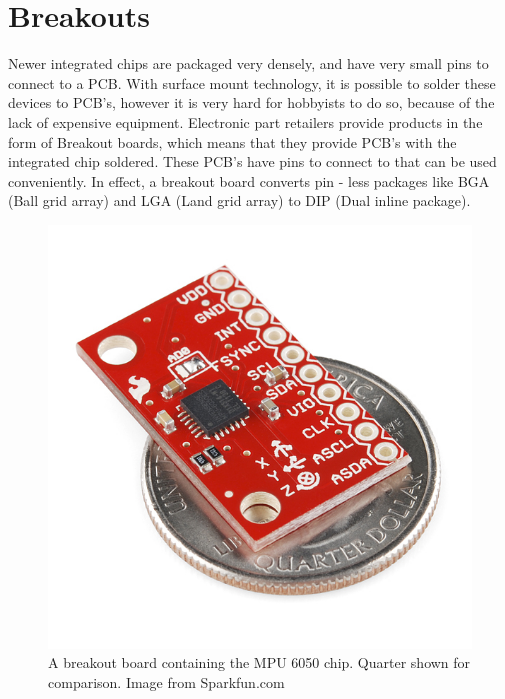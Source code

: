 \section{Breakouts}
\label{Sec:Breakouts}
Newer integrated chips are packaged very densely, and have very small pins to connect to a PCB. With surface mount technology, it is possible to solder these devices to PCB's, however it is very hard for hobbyists to do so, because of the lack of expensive equipment. Electronic part retailers provide products in the form of Breakout boards, which means that they provide PCB's with the integrated chip soldered. These PCB's have pins to connect to that can be used conveniently. In effect, a breakout board converts pin - less packages like BGA (Ball grid array) and LGA (Land grid array) to DIP (Dual inline package).
\begin{figure}
\begin{center}
\includegraphics{images/MPUBreakout.jpg}
\caption{A breakout board containing the MPU 6050 chip. Quarter shown for comparison. Image from Sparkfun.com}
\label{Fig:MPUBreakOut}
\end{center}
\end{figure}

